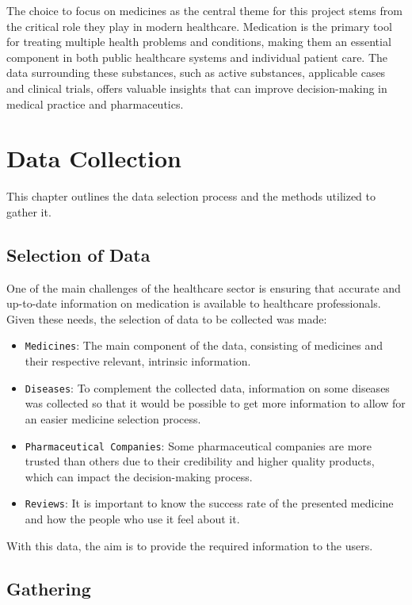 \documentclass[sigconf]{acmart}
\begin{document}
The choice to focus on medicines as the central theme for this project stems from the critical role they play in modern healthcare. Medication is the primary tool for treating multiple health problems and conditions, making them an essential component in both public healthcare systems and individual patient care. The data surrounding these substances, such as active substances, applicable cases and clinical trials, offers valuable insights that can improve decision-making in medical practice and pharmaceutics.

\section{Data Collection}

This chapter outlines the data selection process and the methods utilized to gather it.

\subsection{Selection of Data}

One of the main challenges of the healthcare sector is ensuring that accurate and up-to-date information on medication is available to healthcare professionals. Given these needs, the selection of data to be collected was made:

\begin{itemize}
	\item {\texttt{Medicines}}: The main component of the data, consisting of medicines and their respective relevant, intrinsic information.
	\item {\texttt{Diseases}}: To complement the collected data, information on some diseases was collected so that it would be possible to get more information to allow for an easier medicine selection process.
	\item {\texttt{Pharmaceutical Companies}}: Some pharmaceutical companies are more trusted than others due to their credibility and higher quality products, which can impact the decision-making process.
	\item {\texttt{Reviews}}: It is important to know the success rate of the presented medicine and how the people who use it feel about it.
\end{itemize}

With this data, the aim is to provide the required information to the users.

\subsection{Gathering}
\end{document}
